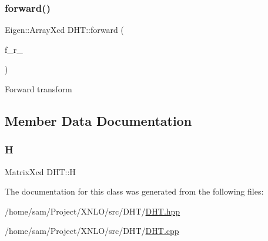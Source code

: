 \subsubsection{\texorpdfstring{forward()}{forward()}}
{\footnotesize\ttfamily Eigen\+::\+Array\+Xcd D\+H\+T\+::forward (\begin{DoxyParamCaption}\item[{Eigen\+::\+Array\+Xcd}]{f\+\_\+r\+\_\+ }\end{DoxyParamCaption})}

Forward transform 

\subsection{Member Data Documentation}
\mbox{\label{class_d_h_t_ac17a580b606f25c937dbdc81dba517d7}} 
\subsubsection{\texorpdfstring{H}{H}}
{\footnotesize\ttfamily Matrix\+Xcd D\+H\+T\+::H}



The documentation for this class was generated from the following files\+:\begin{DoxyCompactItemize}
\item 
/home/sam/\+Project/\+X\+N\+L\+O/src/\+D\+H\+T/\mbox{\hyperlink{_d_h_t_8hpp}{D\+H\+T.\+hpp}}\item 
/home/sam/\+Project/\+X\+N\+L\+O/src/\+D\+H\+T/\mbox{\hyperlink{_d_h_t_8cpp}{D\+H\+T.\+cpp}}\end{DoxyCompactItemize}
